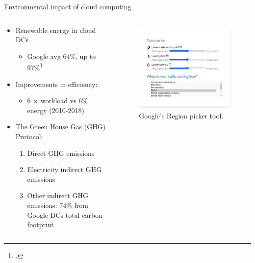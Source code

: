 \documentclass[Ligatures=TeX,table,svgnames,usetotalslideindicator,compress,10pt,aspectratio=169]{beamer}
\begin{document}
\begin{frame}{Environmental impact of cloud computing}
\begin{columns}        
\begin{column}{0.7\textwidth}
  \begin{itemize}    
  \item Renewable energy in cloud DCs
  \begin{itemize}
    \item Google avg 64\%, up to 97\%\footcite{google_sustainability_report_2023}
 \end{itemize} 
  \item Improvements in efficiency:
  \begin{itemize}
    \item 6 $\times$ workload vs 6\% energy (2010-2018)
  \end{itemize} 
  \item The Green House Gas (GHG) Protocol:
    \begin{enumerate}        
       \item Direct GHG emissions
       \item Electricity indirect GHG emissions
       \item Other indirect GHG emissions: 74\% from Google DCs total carbon footprint
       \end{enumerate}
   \end{itemize}   

\end{column}        
\begin{column}{0.3\textwidth}
      \begin{figure}[!h]
        \centering
        \includegraphics[width=\textwidth]{images/google_region_picker.jpeg}
        \caption{Google's Region picker tool.}
      \end{figure}
    \end{column}        
\end{columns}

\end{frame}
\end{document}
